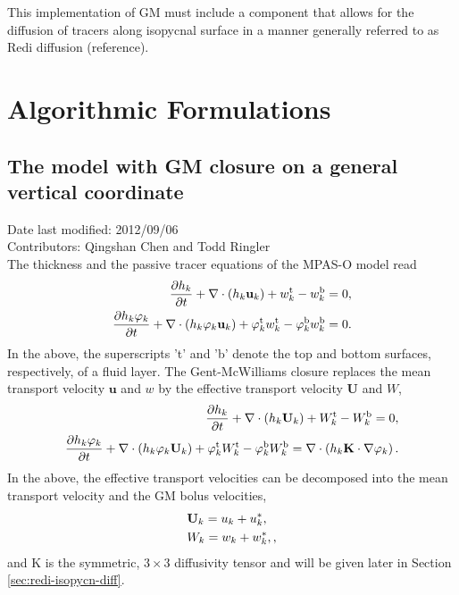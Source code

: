 \documentclass[12pt]{report}
\def\bs{\boldsymbol}
\def\ub{\mathbf{u}}
\def\Ub{\mathbf{U}}
\def\Kb{\bs{\mathrm{K}}}
\begin{document}
This implementation of GM must include a component that allows for the diffusion of tracers along isopycnal surface in a manner generally referred to as Redi diffusion (reference).


\chapter{Algorithmic Formulations}

\section{The model with GM closure on a general vertical coordinate}
Date last modified: 2012/09/06 \\
Contributors: Qingshan Chen and Todd Ringler\\

The thickness and the passive tracer equations of the MPAS-O model read
\begin{align}   
\dfrac{\partial h_k}{\partial t} 
 + \nabla \cdot \left( h_k {\bf u}_k \right) 
 + w_k^\textrm{t} - w_k^\textrm{b} = 0\label{eq:1},
\\
\dfrac{\partial h_k\varphi_k}{\partial t} 
 + \nabla \cdot \left( h_k\varphi_k {\bf u}_k \right) 
  + \varphi_k^\textrm{t} w_k^\textrm{t} - \varphi_k^\textrm{b} w_k^\textrm{b}
= 0.\label{eq:4}
\end{align}
In the above, the superscripts 't' and 'b' denote the top and bottom surfaces,
respectively, of a fluid layer.
The Gent-McWilliams closure replaces the mean transport velocity $\ub$
and $w$ by the effective transport velocity $\Ub$ and $W$,
\begin{align}   
\dfrac{\partial h_k}{\partial t} 
 + \nabla \cdot \left( h_k {\bf U}_k \right) 
 + W_k^\textrm{t} - W_k^\textrm{b} = 0,\label{eq:5}
\\
\dfrac{\partial h_k\varphi_k}{\partial t} 
 + \nabla \cdot \left( h_k\varphi_k{\bf U}_k \right) 
  + \varphi_k^\textrm{t} W_k^\textrm{t} - \varphi_k^\textrm{b} W_k^\textrm{b}  
= \nabla\cdot\left(h_k \Kb \cdot \nabla\varphi_k \right).\label{eq:6}
\end{align}
In the above, the effective transport velocities can be decomposed
into the mean transport velocity and the GM bolus velocities, 
\begin{align}
&{\bf U}_k = u_k + u^\ast_k,\label{eq:7}\\ 
& W_k = w_k + w^\ast_k,\label{eq:8},
\end{align}
and $\Kb$ is the symmetric, $3\times 3$ diffusivity tensor and will be given later in Section
\ref{sec:redi-isopycn-diff}. 
\end{document}
